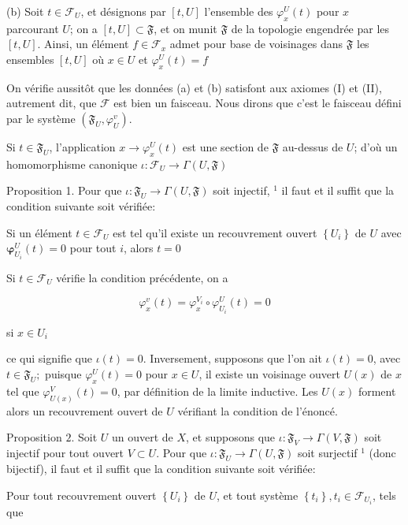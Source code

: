 (b) Soit $t \in \mathcal{F}_{U}$, et désignons par $[t, U]$ l'ensemble des $\varphi_{x}^{U}(t)$ pour $x$ parcourant $U$; on a $[t, U] \subset \mathfrak{F}$, et on munit $\mathfrak{F}$ de la topologie engendrée par les $[t, U]$. Ainsi, un élément $f \in \mathcal{F}_{x}$ admet pour base de voisinages dans $\mathfrak{F}$ les ensembles $[t, U]$ où $x \in U$ et $\varphi_{x}^{U}(t)=f$

On vérifie aussitôt que les données (a) et (b) satisfont aux axiomes (I) et (II), autrement dit, que $\mathcal{F}$ est bien un faisceau. Nous dirons que c'est le faisceau défini par le système $\left(\mathfrak{F}_{U}, \varphi_{U}^{v}\right)$.

Si $t \in \mathfrak{F}_{U}$, l'application $x \rightarrow \varphi_{x}^{U}(t)$ est une section de $\mathfrak{F}$ au-dessus de $U$; d'où un homomorphisme canonique $\iota: \mathcal{F}_{U} \rightarrow \Gamma(U, \mathfrak{F})$

Proposition 1. Pour que $\iota: \mathfrak{F}_{U} \rightarrow \Gamma(U, \mathfrak{F})$ soit injectif, ${ }^{1}$ il faut et il suffit que la condition suivante soit vérifiée:

Si un élément $t \in \mathcal{F}_{U}$ est tel qu'il existe un recouvrement ouvert $\left\{U_{i}\right\}$ de $U$ avec $\boldsymbol{\varphi}_{U_{i}}^{U}(t)=0$ pour tout $i$, alors $t=0$

Si $t \in \mathcal{F}_{U}$ vérifie la condition précédente, on a

$$
\varphi_{x}^{v}(t)=\varphi_{x}^{V_{i}} \circ \varphi_{U_{i}}^{U}(t)=0
$$

si $x \in U_{i}$

ce qui signifie que $\iota(t)=0 .$ Inversement, supposons que l'on ait $\iota(t)=0$, avec $t \in \mathfrak{F}_{U} ;$ puisque $\varphi_{x}^{U}(t)=0$ pour $x \in U$, il existe un voisinage ouvert $U(x)$ de $x$ tel que $\varphi_{U(x)}^{V}(t)=0$, par définition de la limite inductive. Les $U(x)$ forment alors un recouvrement ouvert de $U$ vérifiant la condition de l'énoncé.

Proposition $2 .$ Soit $U$ un ouvert de $X$, et supposons que $\iota: \mathfrak{F}_{V} \rightarrow \Gamma(V, \mathfrak{F})$ soit injectif pour tout ouvert $V \subset U$. Pour que $\iota: \mathfrak{F}_{U} \rightarrow \Gamma(U, \mathfrak{F})$ soit surjectif $^{1}$ (donc bijectif), il faut et il suffit que la condition suivante soit vérifiée:

Pour tout recouvrement ouvert $\left\{U_{i}\right\}$ de $U$, et tout système $\left\{t_{i}\right\}, t_{i} \in \mathcal{F}_{U_{i}}$, tels que

